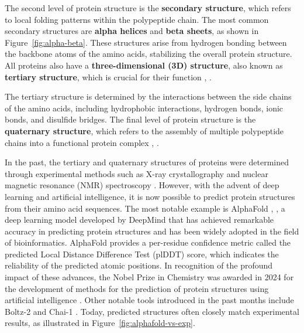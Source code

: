 The second level of protein structure is the \textbf{secondary structure}, which refers to local folding patterns within the polypeptide chain. The most common secondary structures are \textbf{alpha helices} and \textbf{beta sheets}, as shown in Figure~\ref{fig:alpha-beta}. These structures arise from hydrogen bonding between the backbone atoms of the amino acids, stabilizing the overall protein structure. All proteins also have a \textbf{three-dimensional (3D) structure}, also known as \textbf{tertiary structure}, which is crucial for their function \cite{nelson2008lehninger}, \cite{voet2010biochemistry}.

The tertiary structure is determined by the interactions between the side chains of the amino acids, including hydrophobic interactions, hydrogen bonds, ionic bonds, and disulfide bridges. The final level of protein structure is the \textbf{quaternary structure}, which refers to the assembly of multiple polypeptide chains into a functional protein complex \cite{nelson2008lehninger}, \cite{voet2010biochemistry}.

In the past, the tertiary and quaternary structures of proteins were determined through experimental methods such as X-ray crystallography and nuclear magnetic resonance (NMR) spectroscopy \cite{berman2000protein}. However, with the advent of deep learning and artificial intelligence, it is now possible to predict protein structures from their amino acid sequences. The most notable example is AlphaFold \cite{jumper2021highly}, \cite{abramson2024accurate}, a deep learning model developed by DeepMind that has achieved remarkable accuracy in predicting protein structures and has been widely adopted in the field of bioinformatics. AlphaFold provides a per-residue confidence metric called the predicted Local Distance Difference Test (plDDT) score\footnotemark[1], which indicates the reliability of the predicted atomic positions. In recognition of the profound impact of these advances, the Nobel Prize in Chemistry was awarded in 2024 for the development of methods for the prediction of protein structures using artificial intelligence \cite{abriata2024nobel}. Other notable tools introduced in the past months include Boltz-2 \cite{passaro2025boltz2} and Chai-1 \cite{chai2024chai}. Today, predicted structures often closely match experimental results, as illustrated in Figure~\ref{fig:alphafold-vs-exp}.


